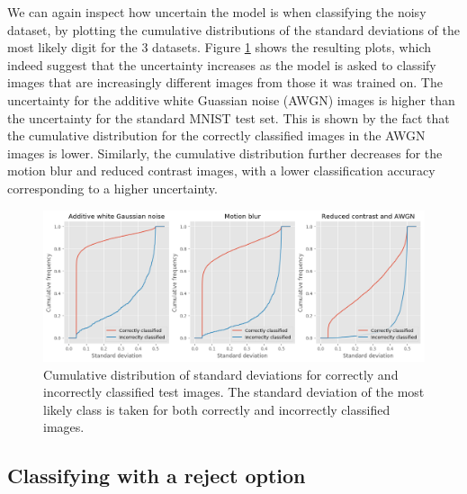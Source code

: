 \documentclass{article}
\begin{document}
We can again inspect how uncertain the model is when classifying the noisy dataset, by plotting the cumulative distributions of the standard deviations of the most likely digit for the 3 datasets. Figure \ref{fig/noisy_mnist_cum_stds} shows the resulting plots, which indeed suggest that the uncertainty increases as the model is asked to classify images that are increasingly different images from those it was trained on. The uncertainty for the additive white Guassian noise (AWGN) images is higher than the uncertainty for the standard MNIST test set. This is shown by the fact that the cumulative distribution for the correctly classified images in the AWGN images is lower. Similarly, the cumulative distribution further decreases for the motion blur and reduced contrast images, with a lower classification accuracy corresponding to a higher uncertainty.

\begin{figure}[H]
	\centering
	\includegraphics[scale=0.4]{noisy_mnist_cum_stds}
	\caption{Cumulative distribution of standard deviations for correctly and incorrectly classified test images. The standard deviation of the most likely class is taken for both correctly and incorrectly classified images.}
	\label{fig/noisy_mnist_cum_stds}
\end{figure}


\subsection{Classifying with a reject option}
\end{document}
